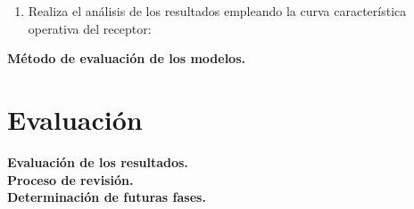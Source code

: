 \begin{enumerate}
	\item Realiza el análisis de los resultados empleando la curva característica operativa del receptor:
\end{enumerate}

\noindent
\textbf{Método de evaluación de los modelos.}\\

\section{Evaluación}

\noindent
\textbf{Evaluación de los resultados.}\\

\noindent
\textbf{Proceso de revisión.}\\

\noindent
\textbf{Determinación de futuras fases.}\\